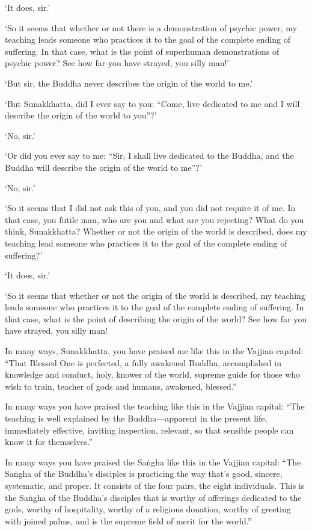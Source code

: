 \documentclass[12pt,openany]{book}%
\begin{document}
‘It does, sir.’ 

‘So it seems that whether or not there is a demonstration of psychic power, my teaching leads someone who practices it to the goal of the complete ending of suffering. In that case, what is the point of superhuman demonstrations of psychic power? See how far you have strayed, you silly man!’ 

‘But sir, the Buddha never describes the origin of the world to me.’ 

‘But Sunakkhatta, did I ever say to you: “Come, live dedicated to me and I will describe the origin of the world to you”?’ 

‘No, sir.’ 

‘Or did you ever say to me: “Sir, I shall live dedicated to the Buddha, and the Buddha will describe the origin of the world to me”?’ 

‘No, sir.’ 

‘So it seems that I did not ask this of you, and you did not require it of me. In that case, you futile man, who are you and what are you rejecting? What do you think, Sunakkhatta? Whether or not the origin of the world is described, does my teaching lead someone who practices it to the goal of the complete ending of suffering?’ 

‘It does, sir.’ 

‘So it seems that whether or not the origin of the world is described, my teaching leads someone who practices it to the goal of the complete ending of suffering. In that case, what is the point of describing the origin of the world? See how far you have strayed, you silly man! 

In many ways, Sunakkhatta, you have praised me like this in the Vajjian capital: “That Blessed One is perfected, a fully awakened Buddha, accomplished in knowledge and conduct, holy, knower of the world, supreme guide for those who wish to train, teacher of gods and humans, awakened, blessed.” 

In many ways you have praised the teaching like this in the Vajjian capital: “The teaching is well explained by the Buddha—apparent in the present life, immediately effective, inviting inspection, relevant, so that sensible people can know it for themselves.” 

In many ways you have praised the \textsanskrit{Saṅgha} like this in the Vajjian capital: “The \textsanskrit{Saṅgha} of the Buddha’s disciples is practicing the way that’s good, sincere, systematic, and proper. It consists of the four pairs, the eight individuals. This is the \textsanskrit{Saṅgha} of the Buddha’s disciples that is worthy of offerings dedicated to the gods, worthy of hospitality, worthy of a religious donation, worthy of greeting with joined palms, and is the supreme field of merit for the world.” 
\end{document}
